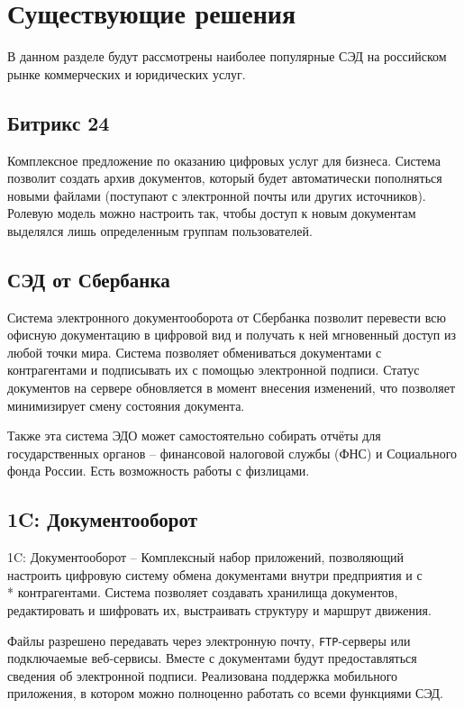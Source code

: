 \clearpage

\section{Существующие решения}

В данном разделе будут рассмотрены наиболее популярные СЭД на российском рынке коммерческих и юридических услуг.

\subsection{Битрикс 24}

Комплексное предложение по оказанию цифровых услуг для бизнеса\cite{bitrix}. Система позволит создать архив документов, который будет автоматически пополняться новыми файлами (поступают с электронной почты или других источников). Ролевую модель можно настроить так, чтобы доступ к новым документам выделялся лишь определенным группам пользователей.

\subsection{СЭД от Сбербанка}

Система электронного документооборота от Сбербанка\cite{sber} позволит перевести всю офисную документацию в цифровой вид и получать к ней мгновенный доступ из любой точки мира. Система позволяет обмениваться документами с контрагентами и подписывать их с помощью электронной подписи. Статус документов на сервере обновляется в момент внесения изменений, что позволяет минимизирует смену состояния документа.

Также эта система ЭДО может самостоятельно собирать отчёты для государственных органов -- финансовой налоговой службы (ФНС) и Социального фонда России. Есть возможность работы с физлицами.

\subsection{1C: Документооборот}

1C: Документооборот -- Комплексный набор приложений, позволяющий настроить цифровую систему обмена документами внутри предприятия и с \\* контрагентами\cite{1c}. Система позволяет создавать хранилища документов, редактировать и шифровать их, выстраивать структуру и маршрут движения.

Файлы разрешено передавать через электронную почту, \texttt{FTP}-серверы или подключаемые веб-сервисы. Вместе с документами будут предоставляться сведения об электронной подписи. Реализована поддержка мобильного приложения, в котором можно полноценно работать со всеми функциями СЭД.

